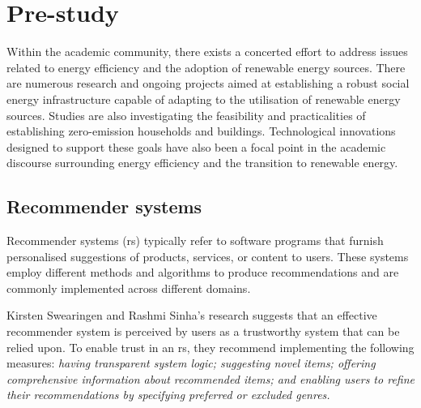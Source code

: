 \chapter{Pre-study} 


Within the academic community, there exists a concerted effort to address issues related to energy efficiency and the adoption of renewable energy sources. 
There are numerous research and ongoing projects aimed at establishing a robust social energy infrastructure capable of adapting to the utilisation of renewable energy sources. 
Studies are also investigating the feasibility and practicalities of establishing zero-emission households and buildings.
Technological innovations designed to support these goals have also been a focal point in the academic discourse surrounding energy efficiency and the transition to renewable energy.



\section{Recommender systems}

Recommender systems (\gls{rs}) typically refer to software programs that furnish personalised suggestions of products, services, or content to users. 
These systems employ different methods and algorithms to produce recommendations and are commonly implemented across different domains. 

Kirsten Swearingen and Rashmi Sinha's research \cite{rs} suggests that an effective recommender system is perceived by users as a trustworthy system that can be relied upon. 
To enable trust in an \gls{rs}, they recommend implementing the following measures:
\emph{
  having transparent system logic; 
  suggesting novel items; 
  offering comprehensive information about recommended items; 
  and enabling users to refine their recommendations by specifying preferred or excluded genres.
}

